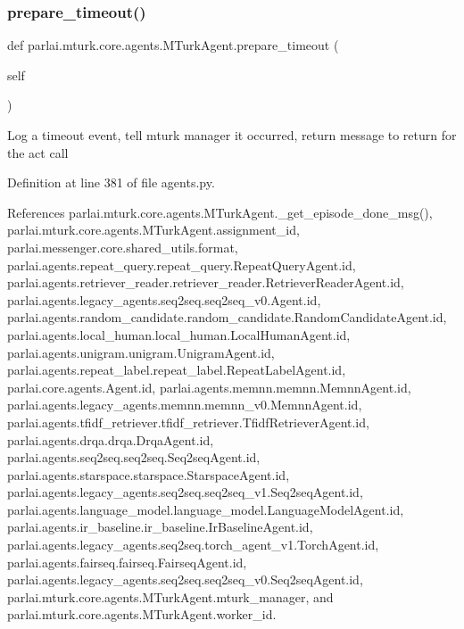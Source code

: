 \subsubsection{\texorpdfstring{prepare\+\_\+timeout()}{prepare\_timeout()}}
{\footnotesize\ttfamily def parlai.\+mturk.\+core.\+agents.\+M\+Turk\+Agent.\+prepare\+\_\+timeout (\begin{DoxyParamCaption}\item[{}]{self }\end{DoxyParamCaption})}

\begin{DoxyVerb}Log a timeout event, tell mturk manager it occurred, return message
to return for the act call
\end{DoxyVerb}
 

Definition at line 381 of file agents.\+py.



References parlai.\+mturk.\+core.\+agents.\+M\+Turk\+Agent.\+\_\+get\+\_\+episode\+\_\+done\+\_\+msg(), parlai.\+mturk.\+core.\+agents.\+M\+Turk\+Agent.\+assignment\+\_\+id, parlai.\+messenger.\+core.\+shared\+\_\+utils.\+format, parlai.\+agents.\+repeat\+\_\+query.\+repeat\+\_\+query.\+Repeat\+Query\+Agent.\+id, parlai.\+agents.\+retriever\+\_\+reader.\+retriever\+\_\+reader.\+Retriever\+Reader\+Agent.\+id, parlai.\+agents.\+legacy\+\_\+agents.\+seq2seq.\+seq2seq\+\_\+v0.\+Agent.\+id, parlai.\+agents.\+random\+\_\+candidate.\+random\+\_\+candidate.\+Random\+Candidate\+Agent.\+id, parlai.\+agents.\+local\+\_\+human.\+local\+\_\+human.\+Local\+Human\+Agent.\+id, parlai.\+agents.\+unigram.\+unigram.\+Unigram\+Agent.\+id, parlai.\+agents.\+repeat\+\_\+label.\+repeat\+\_\+label.\+Repeat\+Label\+Agent.\+id, parlai.\+core.\+agents.\+Agent.\+id, parlai.\+agents.\+memnn.\+memnn.\+Memnn\+Agent.\+id, parlai.\+agents.\+legacy\+\_\+agents.\+memnn.\+memnn\+\_\+v0.\+Memnn\+Agent.\+id, parlai.\+agents.\+tfidf\+\_\+retriever.\+tfidf\+\_\+retriever.\+Tfidf\+Retriever\+Agent.\+id, parlai.\+agents.\+drqa.\+drqa.\+Drqa\+Agent.\+id, parlai.\+agents.\+seq2seq.\+seq2seq.\+Seq2seq\+Agent.\+id, parlai.\+agents.\+starspace.\+starspace.\+Starspace\+Agent.\+id, parlai.\+agents.\+legacy\+\_\+agents.\+seq2seq.\+seq2seq\+\_\+v1.\+Seq2seq\+Agent.\+id, parlai.\+agents.\+language\+\_\+model.\+language\+\_\+model.\+Language\+Model\+Agent.\+id, parlai.\+agents.\+ir\+\_\+baseline.\+ir\+\_\+baseline.\+Ir\+Baseline\+Agent.\+id, parlai.\+agents.\+legacy\+\_\+agents.\+seq2seq.\+torch\+\_\+agent\+\_\+v1.\+Torch\+Agent.\+id, parlai.\+agents.\+fairseq.\+fairseq.\+Fairseq\+Agent.\+id, parlai.\+agents.\+legacy\+\_\+agents.\+seq2seq.\+seq2seq\+\_\+v0.\+Seq2seq\+Agent.\+id, parlai.\+mturk.\+core.\+agents.\+M\+Turk\+Agent.\+mturk\+\_\+manager, and parlai.\+mturk.\+core.\+agents.\+M\+Turk\+Agent.\+worker\+\_\+id.



